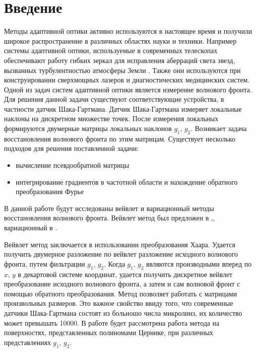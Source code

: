 \documentclass{article}
\begin{document}
\newpage


\newpage
\section*{Введение}
Методы адаптивной оптики активно используются в настоящее время и получили широкое распространение в различных областях науки и техники. Например системы адаптивной оптики, используемые в современных телескопах обеспечивают работу гибких зеркал для исправления аберраций света звезд, вызванных турбулентностью атмосферы Земли \cite{Tyson}. Также они используются при конструировании сверхмощных лазеров и диагностических медицинских систем. Одной из задач систем адаптивной оптики является измерение волнового фронта. Для решения данной задачи существуют соответствующие устройства, в частности датчик Шака-Гартмана. Датчик Шака-Гартмана измеряет локальные наклоны на дискретном множестве точек. После измерения локальных формируются двумерные матрицы локальных наклонов $g_1$, $g_2$. Возникает задача восстановления волнового фронта по этим матрицам.
Существует несколько подходов для решения поставленной задачи:
\begin{itemize}
\item вычисление псевдообратной матрицы \cite{pseudo_inv1}
\item интегрирование градиентов в частотной области и нахождение обратного преобразования Фурье \cite{fourier_1}
\end{itemize}
В данной работе будут исследованы вейвлет и вариационный методы восстановления волнового фронта. Вейвлет метод был предложен в \cite{new_method1},\cite{new_method2}, вариационный в \cite{vatiational_base}.

Вейвлет метод заключается в использовании преобразования Хаара. Удается получить двумерное разложение по вейвлет разложение исходного волнового фронта, путем фильтрации $g_1$, $g_2$. Когда $g_1,\,g_2$ являются производными вперед по $x,\,y$ в декартовой системе координат, удается получить дискретное вейвлет преобразование исходного волнового фронта, а затем и сам волновой фронт с помощью обратного преобразования. Метод позволяет работать с матрицами произвольных размеров. Это важное свойство ввиду того, что современные датчики Шака-Гартмана состоят из больношо числа микролинз, их количество может превышать 10000. 
В работе будет рассмотрена работа метода на поверхностях, представленных полиномами Цернике, при различных представлениях $g_1,\,g_2$.
\end{document}
